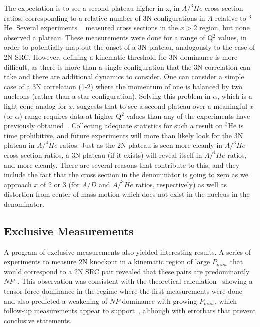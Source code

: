 The expectation is to see a second plateau higher in x, in $A/^3He$ cross section ratios, corresponding to a relative number of 3N configurations in $A$ relative to $^3$He.  Several experiments ~\cite{egiyan2006, fomin2012, Ye2017}  measured cross sections in the $x>$2 region, but none observed a plateau.  These measurements were done for a range of Q$^2$ values, in order to potentially map out the onset of a 3N plateau, analogously to the case of 2N SRC.  However, defining a kinematic threshold for 3N dominance is more difficult, as there is more than a single configuration that the 3N correlation can take and there are additional dynamics to consider.  One can consider a simple case of a 3N correlation (1-2) where the momentum of one is balanced by two nucleons (rather than a star configuration).  Solving this problem in $\alpha$, which is a light cone analog for $x$, suggests that to see a second plateau over a meaningful $x$ (or $\alpha$) range requires data at higher Q$^2$ values than any of the experiments have previously obtained~\cite{fomin17}.  Collecting adequate statistics for such a result on $^3$He is time prohibitive, and future experiments will more than likely look for the 3N plateau in $A/^4He$ ratios.  Just as the 2N plateau is seen more cleanly in $A/^3He$ cross section ratios, a 3N plateau (if it exists) will reveal itself in  $A/^4He$ ratios, and more cleanly.  There are several reasons that contribute to this, and they include the fact that the cross section in the denominator is going to zero as we approach $x$ of 2 or 3 (for $A/D$ and $A/^3He$ ratios, respectively) as well as distortion from center-of-mass motion which does not exist in the nucleus in the denominator. 

\subsection{Exclusive Measurements}
A program of exclusive measurements also yielded interesting results. A series of experiments to measure 2N knockout in a kinematic region of large $P_{miss}$ that would correspond to a 2N SRC pair revealed that these pairs are predominantly $NP$~\cite{Subedi:2008zz, Shneor:2007tu}.  This observation was consistent with the theoretical calculation~\cite{Schiavilla:2006xx} showing a tensor force dominance in the regime where the first measurements were done and also predicted a weakening of $NP$ dominance with growing $P_{miss}$, which follow-up measurements appear to support~\cite{korover2014}, although with errorbars that prevent conclusive statements. 


